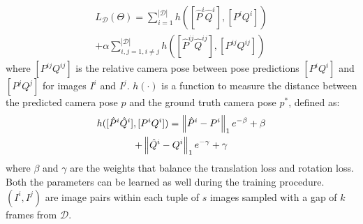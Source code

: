 \begin{multline}
    L_\mathcal{D}(\Theta) = \sum\limits_{i=1}^{|\mathcal{D}|} h([\hat{P}^i \hat{Q}^i], [P^i Q^i])\\
    + \alpha\sum\limits_{i,j=1, i\neq j}^{|\mathcal{D}|} h([\hat{P}^{ij} \hat{Q}^{ij}], [P^{ij} Q^{ij}])
    \label{eq:mapnet-loss}
\end{multline}
where $[P^{ij} Q^{ij}]$ is the relative camera pose between pose predictions $[P^i Q^i]$ and $[P^j Q^j]$ for images $I^i$ and $I^j$.
$h(\cdot)$ is a function to measure the distance between the predicted camera pose $p$ and the ground truth camera pose $p^*$, defined as:
\begin{multline}
    h([\hat{P}^i \hat{Q}^i], [P^i Q^i]) = \norm{\hat{P}^i-P^i}_1 e^{-\beta} + \beta\\
    + \norm{\hat{Q}^i-Q^i}_1 e^{-\gamma} + \gamma
    \label{eq:mapnet-loss-h}
\end{multline}
where $\beta$ and $\gamma$ are the weights that balance the translation loss and rotation loss. Both the parameters can be learned as well during the training procedure. $(I^i, I^j)$ are image pairs within each tuple of $s$ images sampled with a gap of $k$ frames from $\mathcal{D}$.
